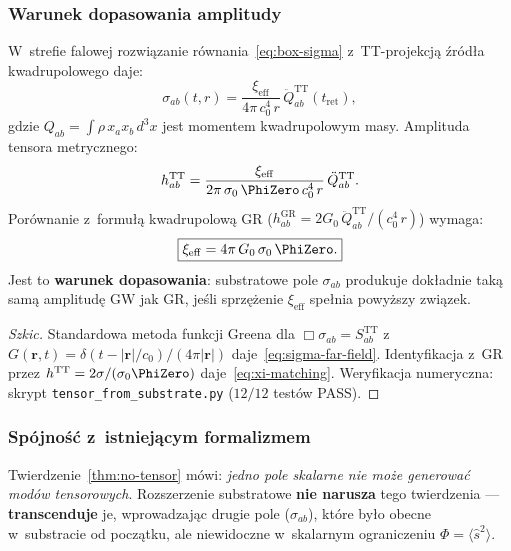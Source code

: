 \subsubsection{Warunek dopasowania amplitudy}

\begin{theorem}[Dopasowanie do GR]\label{thm:amplitude-matching}
W~strefie falowej rozwi\k{a}zanie r\'ownania~\eqref{eq:box-sigma}
z~TT-projekcj\k{a} \'zr\'od\l{}a kwadrupolowego daje:
\begin{equation}\label{eq:sigma-far-field}
  \sigma_{ab}(t, r) = \frac{\xi_{\mathrm{eff}}}{4\pi\,c_0^4\,r}\,
  \ddot{Q}_{ab}^{\mathrm{TT}}(t_{\mathrm{ret}}),
\end{equation}
gdzie $Q_{ab} = \int\!\rho\,x_a x_b\,d^3x$ jest momentem kwadrupolowym masy.
Amplituda tensora metrycznego:
\begin{equation}
  h_{ab}^{\mathrm{TT}}
  = \frac{\xi_{\mathrm{eff}}}{2\pi\,\sigma_0\,\PhiZero\,c_0^4\,r}\,
  \ddot{Q}_{ab}^{\mathrm{TT}}.
\end{equation}
Por\'ownanie z~formu\l{}\k{a} kwadrupolow\k{a} GR
($h_{ab}^{\mathrm{GR}} = 2G_0\,\ddot{Q}_{ab}^{\mathrm{TT}}/(c_0^4\,r)$)
wymaga:
\begin{equation}\label{eq:xi-matching}
  \boxed{
    \xi_{\mathrm{eff}}
    = 4\pi\,G_0\,\sigma_0\,\PhiZero.
  }
\end{equation}
Jest to \textbf{warunek dopasowania}: substratowe pole $\sigma_{ab}$
produkuje dok\l{}adnie tak\k{a} sam\k{a} amplitud\k{e} GW
jak GR, je\'sli sprz\k{e}\.zenie $\xi_{\mathrm{eff}}$
spe\l{}nia powy\.zszy zwi\k{a}zek.
\end{theorem}

\begin{proof}[Szkic]
Standardowa metoda funkcji Greena dla $\Box\sigma_{ab} = S_{ab}^{\mathrm{TT}}$
z~$G(\mathbf{r},t) = \delta(t-|\mathbf{r}|/c_0)/(4\pi|\mathbf{r}|)$
daje~\eqref{eq:sigma-far-field}. Identyfikacja z~GR
przez $h^{\mathrm{TT}} = 2\sigma/(\sigma_0\PhiZero)$
daje~\eqref{eq:xi-matching}.
Weryfikacja numeryczna: skrypt \texttt{tensor\_from\_substrate.py}
($12/12$ test\'ow PASS).
\end{proof}

\subsubsection{Sp\'ojno\'s\'c z~istniej\k{a}cym formalizmem}

\begin{remark}%
\label{rem:no-tensor-transcended}
Twierdzenie~\ref{thm:no-tensor} m\'owi:
\emph{jedno pole skalarne nie mo\.ze generowa\'c mod\'ow tensorowych}.
Rozszerzenie substratowe \textbf{nie narusza} tego twierdzenia ---
\textbf{transcenduje} je, wprowadzaj\k{a}c drugie pole ($\sigma_{ab}$),
kt\'ore by\l{}o obecne w~substracie od pocz\k{a}tku,
ale niewidoczne w~skalarnym ograniczeniu $\Phi = \langle\hat{s}^2\rangle$.
\end{remark}

